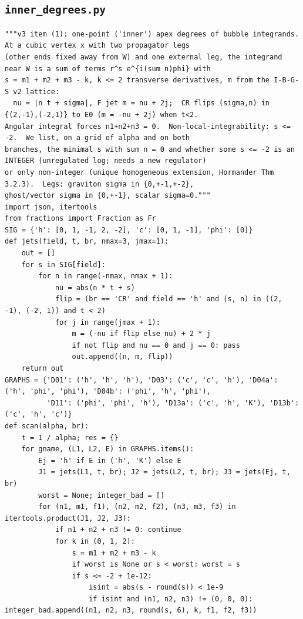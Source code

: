 \documentclass[10pt]{article}
\begin{document}
\subsection{\texttt{inner\_degrees.py}}
\begin{lstlisting}
"""v3 item (1): one-point ('inner') apex degrees of bubble integrands.  At a cubic vertex x with two propagator legs
(other ends fixed away from W) and one external leg, the integrand near W is a sum of terms r^s e^{i(sum n)phi} with
s = m1 + m2 + m3 - k, k <= 2 transverse derivatives, m from the I-B-G-S v2 lattice:
  nu = |n t + sigma|, F jet m = nu + 2j;  CR flips (sigma,n) in {(2,-1),(-2,1)} to E0 (m = -nu + 2j) when t<2.
Angular integral forces n1+n2+n3 = 0.  Non-local-integrability: s <= -2.  We list, on a grid of alpha and on both
branches, the minimal s with sum n = 0 and whether some s <= -2 is an INTEGER (unregulated log; needs a new regulator)
or only non-integer (unique homogeneous extension, Hormander Thm 3.2.3).  Legs: graviton sigma in {0,+-1,+-2},
ghost/vector sigma in {0,+-1}, scalar sigma=0."""
import json, itertools
from fractions import Fraction as Fr
SIG = {'h': [0, 1, -1, 2, -2], 'c': [0, 1, -1], 'phi': [0]}
def jets(field, t, br, nmax=3, jmax=1):
    out = []
    for s in SIG[field]:
        for n in range(-nmax, nmax + 1):
            nu = abs(n * t + s)
            flip = (br == 'CR' and field == 'h' and (s, n) in ((2, -1), (-2, 1)) and t < 2)
            for j in range(jmax + 1):
                m = (-nu if flip else nu) + 2 * j
                if not flip and nu == 0 and j == 0: pass
                out.append((n, m, flip))
    return out
GRAPHS = {'D01': ('h', 'h', 'h'), 'D03': ('c', 'c', 'h'), 'D04a': ('h', 'phi', 'phi'), 'D04b': ('phi', 'h', 'phi'),
          'D11': ('phi', 'phi', 'h'), 'D13a': ('c', 'h', 'K'), 'D13b': ('c', 'h', 'c')}
def scan(alpha, br):
    t = 1 / alpha; res = {}
    for gname, (L1, L2, E) in GRAPHS.items():
        Ej = 'h' if E in ('h', 'K') else E
        J1 = jets(L1, t, br); J2 = jets(L2, t, br); J3 = jets(Ej, t, br)
        worst = None; integer_bad = []
        for (n1, m1, f1), (n2, m2, f2), (n3, m3, f3) in itertools.product(J1, J2, J3):
            if n1 + n2 + n3 != 0: continue
            for k in (0, 1, 2):
                s = m1 + m2 + m3 - k
                if worst is None or s < worst: worst = s
                if s <= -2 + 1e-12:
                    isint = abs(s - round(s)) < 1e-9
                    if isint and (n1, n2, n3) != (0, 0, 0): integer_bad.append((n1, n2, n3, round(s, 6), k, f1, f2, f3))

\end{lstlisting}
\end{document}
